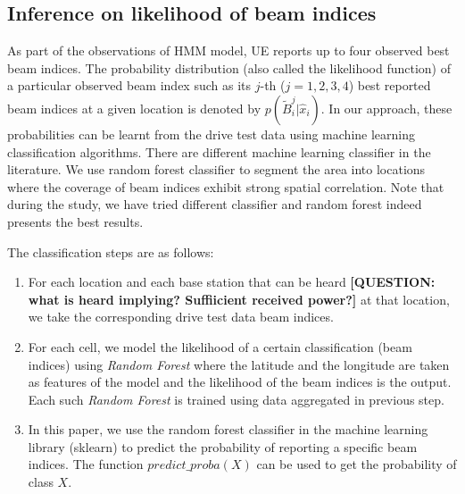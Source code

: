 \documentclass[conference, 10pt]{IEEEtran}
\begin{document}
\subsection{Inference on likelihood of beam indices}
\label{sec:prob-classification}
As part of the observations of HMM model, UE reports up to four observed best beam indices. The probability
distribution (also called the likelihood function) of a particular observed beam index such as its $j$-th ($j=1, 2, 3, 4$) best reported beam indices
at a given location is denoted by
$p(\tilde{B}^j_i|\hat{x}_{i})$. In our approach, these probabilities
can be learnt from the drive test data using machine learning classification algorithms.
There are different machine learning classifier in the literature. We use random forest classifier to segment the area into locations where the coverage of beam indices
exhibit strong spatial correlation. Note that during the study, we have tried different classifier and random forest indeed presents the best results.

The classification steps are as follows:

\begin{enumerate}

    \item For each location and each base station that can be heard \textbf{[QUESTION: what is heard implying? Suffiicient received power?] }  at that location, we
take the corresponding drive test data beam indices. 

\item For each cell, we model the likelihood of a certain classification (beam indices) using {\em Random Forest} where the latitude and the longitude are 
taken as features of the model and the likelihood of the beam indices is the output. Each such {\em
Random Forest} is trained using data aggregated in previous step.

\item In this paper, we use the random forest classifier in the machine learning library (sklearn) to predict the probability of 
reporting a specific beam indices. The function $predict\_proba(X)$ can be used to get the probability of class $X$. 

\end{enumerate}
\end{document}
